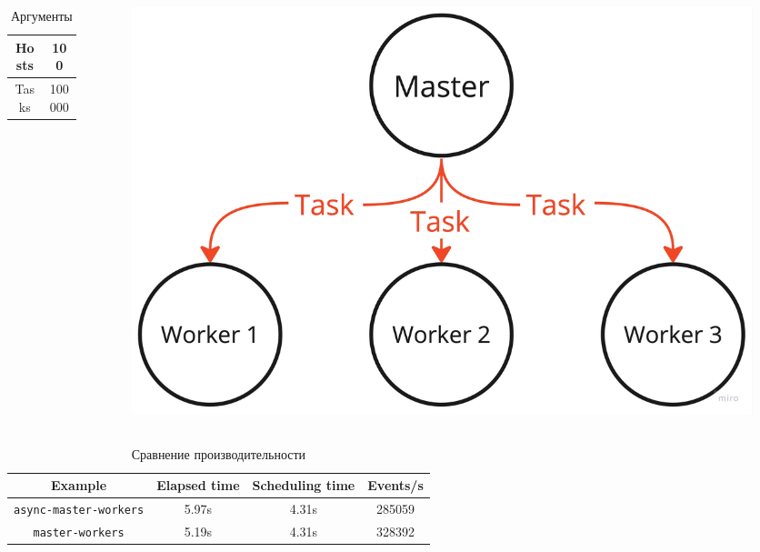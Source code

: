 \documentclass[t]{beamer}  %
\begin{document}
 \begin{frame}[fragile]
	\frametitle{\insertsection} 
	\framesubtitle{\insertsubsection}

	\begin{columns}
		\begin{column}[t]{0.3\linewidth}
			\vspace{0.5cm}
			\begin{table}[H]
				\centering
				\begin{tabular}{|c|c|}
					\hline
					Hosts & 100 \\
					\hline
					Tasks &  100000\\
					\hline
				\end{tabular}
			\caption*{Аргументы}
			\end{table}
		\end{column}
		\begin{column}[t]{0.6\linewidth}
			\vspace{-1cm}

			\begin{figure}[H]
				\centering
				\includegraphics[width=\linewidth]{images/master_workers_scheme}
			\end{figure}
		\end{column}
	\end{columns}
	\vspace{0.3cm}
	\begin{table}[H]
		\small
		\centering
		\begin{tabular}{|c|c|c|c|}
			\hline
			Example & Elapsed time & Scheduling time & Events/s \\
			\hline
			\texttt{async-master-workers} & 5.97s & 4.31s & 285059 \\
			\hline
			\texttt{master-workers}  & 5.19s & 4.31s & 328392 \\
			\hline
		\end{tabular}
		\caption*{Сравнение производительности}
		\label{cmp:master-workers}
	\end{table}
\end{frame}
\end{document}

